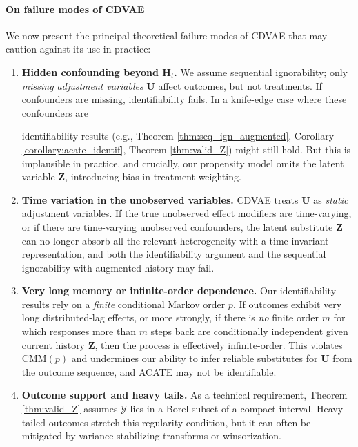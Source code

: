 \documentclass[10pt]{article} %
\begin{document}
\paragraph{On failure modes of CDVAE} We now present the principal theoretical failure modes of CDVAE that may caution against its use in practice:
\begin{enumerate}
    \item \textbf{Hidden confounding beyond $\mathbf H_t$.} We assume sequential ignorability; only \emph{missing adjustment variables} $\mathbf{U}$ affect outcomes, but not treatments. If confounders are missing, identifiability fails. In a knife-edge case where these confounders are  identifiability results (e.g., Theorem \ref{thm:seq_ign_augmented}, Corollary \ref{corollary:acate_identif}, Theorem \ref{thm:valid_Z}) might still hold. But this is implausible in practice, and crucially, our propensity model omits the latent variable $\mathbf{Z}$, introducing bias in treatment weighting.
\item \textbf{Time variation in the unobserved variables.} CDVAE treats $\mathbf{U}$ as \emph{static} adjustment variables. If the true unobserved effect modifiers are time-varying, or if there are time-varying unobserved confounders, the latent substitute $\mathbf{Z}$ can no longer absorb all the relevant heterogeneity with a time-invariant representation, and both the identifiability argument and the sequential ignorability with augmented history may fail.
\item \textbf{Very long memory or infinite-order dependence.} Our identifiability results rely on a \emph{finite} conditional Markov order $p$. If outcomes exhibit very long distributed-lag effects, or more strongly, if there is \emph{no} finite order $m$ for which responses more than $m$ steps back are conditionally independent given current history $\mathbf{Z}$, then the process is effectively infinite-order. This violates $\mathrm{CMM}(p)$ and undermines our ability to infer reliable substitutes for $\mathbf{U}$ from the outcome sequence, and ACATE may not be identifiable.
\item \textbf{Outcome support and heavy tails.} As a technical requirement, Theorem \ref{thm:valid_Z} assumes $\mathcal{Y}$ lies in a Borel subset of a compact interval. Heavy-tailed outcomes stretch this regularity condition, but it can often be mitigated by variance-stabilizing transforms or winsorization.

\end{enumerate}
\end{document}
